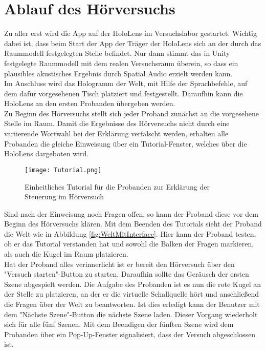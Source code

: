 \vspace*{180pt}
 \section{Ablauf des Hörversuchs}
 Zu aller erst wird die App auf der HoloLens im Versuchslabor gestartet. Wichtig dabei ist, dass beim Start der App der Träger der HoloLens sich an der durch das Raummodell festgelegten Stelle befindet. Nur dann stimmt das in Unity festgelegte Raummodell mit dem realen Versuchsraum überein, so dass ein plausibles akustisches Ergebnis durch Spatial Audio erzielt werden kann. \\
 
 Im Anschluss wird das Hologramm der Welt, mit Hilfe der Sprachbefehle, auf dem dafür vorgesehenen Tisch platziert und festgestellt. Daraufhin kann die HoloLens an den ersten Probanden übergeben werden. \\
 
Zu Beginn des Hörversuchs stellt sich jeder Proband zunächst an die vorgesehene Stelle im Raum. Damit die Ergebnisse des Hörversuchs nicht durch eine variierende Wortwahl bei der Erklärung verfälscht werden, erhalten alle Probanden die gleiche Einweisung über ein Tutorial-Fenster, welches über die HoloLens dargeboten wird.  \\

 \begin{figure}[H]
\centering
\texttt{[image: Tutorial.png]}
\caption{Einheitliches Tutorial für die Probanden zur Erklärung der Steuerung im Hörversuch}
\label{fig:Tutorial}
\end{figure} 

Sind nach der Einweisung noch Fragen offen, so kann der Proband diese vor dem Beginn des Hörversuchs klären. Mit dem Beenden des Tutorials sieht der Proband die Welt wie in Abbildung \ref{fig:WeltMitInterface}. Hier kann der Proband testen, ob er das Tutorial verstanden hat und sowohl die Balken der Fragen markieren, als auch die Kugel im Raum platzieren.  \\
 
 Hat der Proband alles verinnerlicht ist er bereit den Hörversuch über den "Versuch starten"-Button zu starten. Daraufhin sollte das Geräusch der ersten Szene abgespielt werden. Die Aufgabe des Probanden ist es nun die rote Kugel an der Stelle zu platzieren, an der er die virtuelle Schallquelle hört und anschließend die Fragen über der Welt zu beantworten. Ist dies erledigt kann der Benutzer mit dem "Nächste Szene"-Button die nächste Szene laden. Dieser Vorgang wiederholt sich für alle fünf Szenen. Mit dem Beendigen der fünften Szene wird dem Probanden über ein Pop-Up-Fenster signalisiert, dass der Versuch abgeschlossen ist. \\
 
